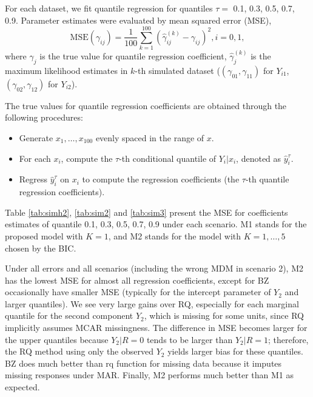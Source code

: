 \documentclass[12pt]{article}
\begin{document}
For each dataset, we fit quantile regression for quantiles $\tau =$ 0.1, 0.3, 0.5, 0.7, 0.9.
Parameter estimates were evaluated by mean squared error (MSE),
\begin{displaymath}
  \mbox{MSE} (\gamma_{ij}) = \frac{1}{100} \sum_{k = 1}^{100}
  \left( \hat{\gamma}_{ij}^{(k)}  - \gamma_{ij}\right)^2, i = 0, 1,
\end{displaymath}
where $\gamma_{j}$ is the true value for quantile regression
coefficient, $\hat{\gamma}_{j}^{(k)}$ is the maximum likelihood
estimates in $k$-th simulated dataset ($(\gamma_{01}, \gamma_{11})$
for $Y_{i1}$, $(\gamma_{02}, \gamma_{12})$ for $Y_{i2}$).

The true values for quantile regression coefficients are obtained through the following procedures:
\begin{itemize}
\item Generate $x_1, \ldots, x_{100}$ evenly spaced in the range of $x$.
\item For each $x_i$, compute the $\tau$-th conditional quantile of $Y_i | x_i$, denoted as $\hat{y}_i^{\tau}$.
\item Regress $\hat{y}_i^{\tau}$ on $x_i$ to compute the regression coefficients (the $\tau$-th quantile regression coefficients).
\end{itemize}


Table \ref{tab:simh2}, \ref{tab:sim2} and \ref{tab:sim3} present the MSE for coefficients estimates of quantile 0.1, 0.3, 0.5, 0.7, 0.9 under each scenario.
M1 stands for the proposed model with $K = 1$, and M2 stands for the model with $K = 1, \ldots, 5$ chosen by the BIC.

Under all errors and all scenarios (including the wrong MDM in scenario 2), M2 has the lowest MSE for almost all regression coefficients, except for BZ occasionally have smaller MSE (typically for the intercept parameter of $Y_2$ and larger quantiles).
We see very large gains over RQ, especially for each
marginal quantile for the second component $Y_2$, which is missing for some units,
since RQ implicitly assumes MCAR missingness.
The difference in MSE becomes larger for the upper quantiles because $Y_2 |R = 0$ tends to be larger than $Y_2 | R = 1$;
therefore, the RQ method using only the observed $Y_2$ yields larger bias for these quantiles.
BZ does much better than rq function for missing data because it imputes missing responses under MAR.
Finally, M2 performs much better than M1 as expected.
\end{document}
